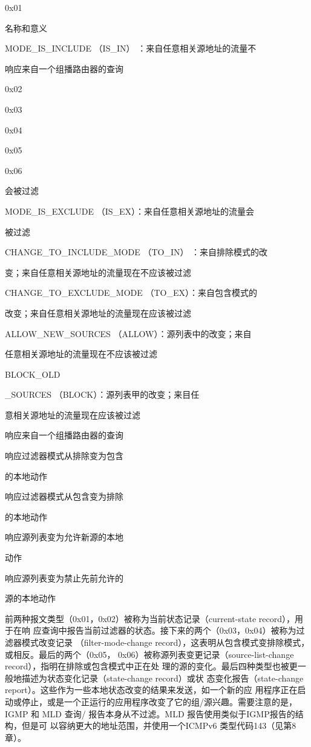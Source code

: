 0x01

名称和意义

MODE\_IS\_INCLUDE （IS\_IN） ：来自任意相关源地址的流量不

响应来自一个组播路由器的查询

0x02

0x03

0x04

0x05

0x06

会被过滤

MODE\_IS\_EXCLUDE （IS\_EX）：来自任意相关源地址的流量会

被过滤

CHANGE\_TO\_INCLUDE\_MODE （TO\_IN） ：来自排除模式的改

变；来自任意相关源地址的流量现在不应该被过滤

CHANGE\_TO\_EXCLUDE\_MODE （TO\_EX）：来自包含模式的

改变；来自任意相关源地址的流量现在应该被过滤

ALLOW\_NEW\_SOURCES （ALLOW）：源列表中的改变；来自

任意相关源地址的流量现在不应该被过滤

BLOCK\_OLD

\_SOURCES （BLOCK）：源列表甲的改变；来目任

意相关源地址的流量现在应该被过滤

响应来自一个组播路由器的查询

响应过滤器模式从排除变为包含

的本地动作

响应过滤器模式从包含变为排除

的本地动作

响应源列表变为允许新源的本地

动作

响应源列表变为禁止先前允许的

源的本地动作

前两种报文类型（0x01，0x02）被称为当前状态记录（current-state record），用于在响
应查询中报告当前过滤器的状态。接下来的两个（0x03，0x04）被称为过滤器模式改变记录
（filter-mode-change record），这表明从包含模式变排除模式，或相反。最后的两个（0x05，
0x06）被称源列表变更记录（source-list-change record），指明在排除或包含模式中正在处
理的源的变化。最后四种类型也被更一般地描述为状态变化记录（state-change record）或状
态变化报告（state-change report）。这些作为一些本地状态改变的结果来发送，如一个新的应
用程序正在启动或停止，或是一个正运行的应用程序改变了它的组/源兴趣。需要注意的是，
IGMP 和 MLD 查询/ 报告本身从不过滤。MLD 报告使用类似于IGMP报告的结构，但是可
以容纳更大的地址范围，并使用一个ICMPv6 类型代码143（见第8章）。

